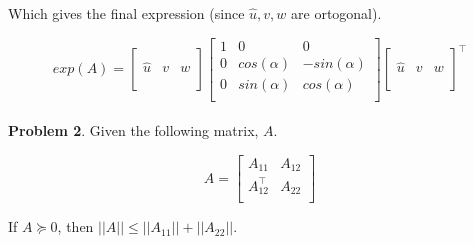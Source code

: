 \documentclass[a4paper]{article}
\begin{document}
Which gives the final expression (since $\hat u, v, w$ are ortogonal).

\[
    exp(A) = \begin{bmatrix}
            \\
            \hat u & v & w \\
            \\
        \end{bmatrix}
        \begin{bmatrix}
            1 & 0 & 0 \\
            0 & cos(\alpha) & -sin(\alpha) \\
            0 & sin(\alpha) & cos(\alpha) \\
        \end{bmatrix}
        \begin{bmatrix}
            \\
            \hat u & v & w \\
            \\
        \end{bmatrix}^\intercal
\] \\

\textbf{Problem 2}. Given the following matrix, $A$.

\[
    A = \begin{bmatrix}
        A_{11}            & A_{12} \\
        A_{12}^\intercal  & A_{22} \\
        \end{bmatrix}
\]

If $A \succeq 0$, then $||A|| \leq ||A_{11}|| + ||A_{22}||$.
\end{document}
